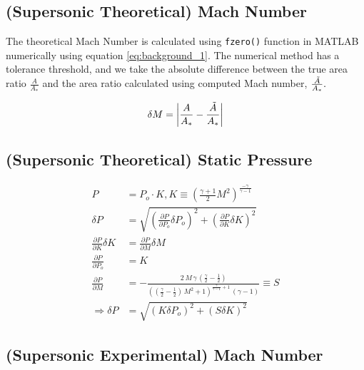 \documentclass[runningheads]{llncs}
\begin{document}
\subsection{(Supersonic Theoretical) Mach Number}
The theoretical Mach Number is calculated using \verb 'fzero()' function in MATLAB numerically using equation \ref{eq:background_1}. The numerical method has a tolerance threshold, and we take the absolute difference between the true area ratio $\frac{A}{A_*}$ and the area ratio calculated using computed Mach number, $\frac{\Tilde{A}}{A_*}.$

$$\delta M = \left| \frac{A}{A_*} - \frac{\Tilde{A}}{A_*} \right|$$

\subsection{(Supersonic Theoretical) Static Pressure}

\begin{align*}
    P &= P_o\cdot K, K \equiv \left(\frac{\gamma + 1}{2}M^2\right)^{\frac{-\gamma}{\gamma - 1}}\\
    \delta P &= \sqrt{\left(\frac{\partial P}{\partial P_o} \delta P_o\right)^2 + \left(\frac{\partial P}{\partial K} \delta K\right)^2}\\
    \frac{\partial P}{\partial K} \delta K &= \frac{\partial P}{\partial M} \delta M \\
    \frac{\partial P}{\partial P_o} &= K\\
    \frac{\partial P}{\partial M} &= -\frac{2\,M\,\gamma \,{\left(\frac{\gamma }{2}-\frac{1}{2}\right)}}{{{\left({\left(\frac{\gamma }{2}-\frac{1}{2}\right)}\,M^2 +1\right)}}^{\frac{\gamma }{\gamma -1}+1} \,{\left(\gamma -1\right)}} \equiv S\\
    \Rightarrow \delta P &= \sqrt{\left(K \delta P_o\right)^2 + \left(S\delta K\right)^2}
\end{align*}

\subsection{(Supersonic Experimental) Mach Number}
\end{document}
